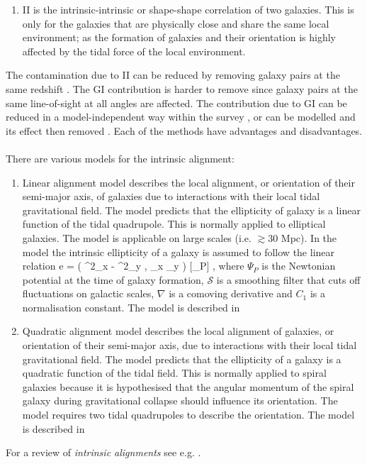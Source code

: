 {\begin{enumerate}
shears a background galaxy. A lens causes background galaxies to be aligned tangentially while galaxies 
physically close to the lens are stretched radially towards the lens due to tidal forces. This produces a negative GI correlation. 
\item II is the intrinsic-intrinsic or shape-shape correlation of two galaxies. This is 
only for the galaxies that are physically close and share the same local environment; as the 
formation of galaxies and their orientation is highly affected by the tidal force of the local environment. 
\end{enumerate}
The contamination due to II can be reduced by removing galaxy pairs at the same 
redshift \citep{2003MNRAS.339..711H,2002A&A...396..411K,2003A&A...398...23K}. The GI 
contribution is harder to remove since galaxy pairs at the same line-of-sight at all angles are affected. 
The contribution due to GI can be reduced in a model-independent way 
within the survey \citep{2008A&A...477...43J,2009A&A...507..105J}, or can be modelled 
and its effect then removed \citep{2005A&A...441...47K,2010A&A...523A...1J}. Each of the methods 
have advantages and disadvantages. 
\\
\\
There are various models for the intrinsic alignment:
\begin{enumerate}
\item Linear alignment model describes the local alignment, or orientation of their semi-major axis, of galaxies due to interactions with their local tidal gravitational field. The model predicts that the ellipticity of 
galaxy is a linear function of the tidal quadrupole. This is normally applied to elliptical galaxies. 
The model is applicable on large scales (i.e. $\gtrsim 30$ Mpc). 
In the model the intrinsic ellipticity of a galaxy is assumed to follow the linear relation
%
\be
e = \left( \nabla^2_x - \nabla^2_y \; , \nabla_x \nabla_y \right) \; [\Psi_P] \; ,
\label{eq:IA.4}
\ee
%
where $\Psi_P$ is the Newtonian potential at the time of galaxy formation, $\mathcal{S}$ is a smoothing filter that cuts off fluctuations on galactic scales, $\nabla$ is a comoving derivative and $C_1$ is a normalisation constant. The model is described in \cite{2001MNRAS.320L...7C,2004PhRvD..70f3526H,2010PhRvD..82d9901H} 
\item Quadratic alignment model describes the local alignment of galaxies, or orientation of their semi-major axis, due to interactions with their local tidal gravitational field. The model predicts that the 
ellipticity of a galaxy is a quadratic function of the tidal field. This is normally applied to spiral 
galaxies because it is hypothesised that the angular momentum of the spiral galaxy during 
gravitational collapse should influence its orientation. The model requires two tidal quadrupoles 
to describe the orientation. The model is described in \cite{2010PhRvD..82d9901H} 
\end{enumerate}
For a review of {\it intrinsic alignments} see e.g. \cite{2015PhR...558....1T}.
}%

